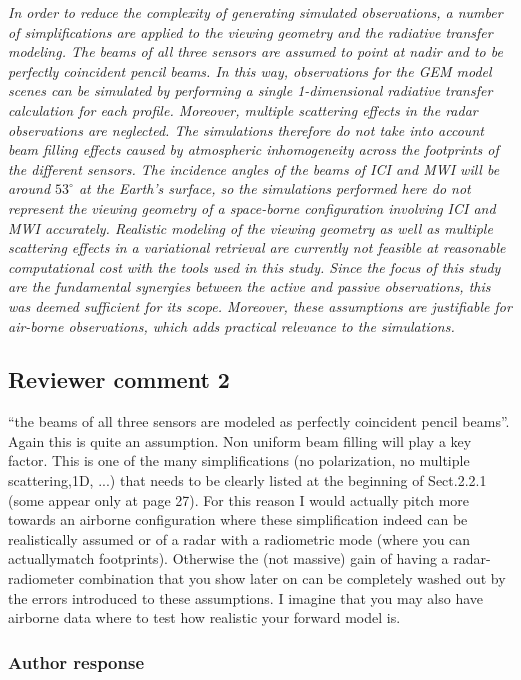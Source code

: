 \documentclass[11pt]{scrartcl}
\begin{document}
{\itshape 
In order to reduce the complexity of generating simulated observations, a number
of simplifications are applied to the viewing geometry and the radiative
transfer modeling. The beams of all three sensors are assumed to point at nadir
and to be perfectly coincident pencil beams. In this way, observations for the
GEM model scenes can be simulated by performing a single 1-dimensional radiative
transfer calculation for each profile. Moreover, multiple scattering effects in
the radar observations are neglected. The simulations therefore do not take into
account beam filling effects caused by atmospheric inhomogeneity across the
footprints of the different sensors. The incidence angles of the beams of ICI
and MWI will be around $53^\circ$ at the Earth's surface, so the simulations
performed here do not represent the viewing geometry of a space-borne
configuration involving ICI and MWI accurately. Realistic modeling of the
viewing geometry as well as multiple scattering effects in a variational
retrieval are currently not feasible at reasonable computational cost with the
tools used in this study. Since the focus of this study are the fundamental
synergies between the active and passive observations, this was deemed
sufficient for its scope. Moreover, these assumptions are justifiable for
air-borne observations, which adds practical relevance to the simulations.
}

\subsection*{Reviewer comment 2}

 “the beams of all three sensors are modeled as perfectly coincident pencil
beams”. Again this is quite an assumption. Non uniform beam filling will play a
key factor. This is one of the many simplifications (no polarization, no multiple
scattering,1D, ...) that needs to be clearly listed at the beginning of
Sect.2.2.1 (some appear only at page 27). For this reason I would actually pitch
more towards an airborne configuration where these simplification indeed can
be realistically assumed or of a radar with a radiometric mode (where you can
actuallymatch footprints). Otherwise the (not massive) gain of having a
radar-radiometer combination that you show later on can be completely washed
out by the errors introduced to these assumptions. I imagine that you may also
have airborne data where to test how realistic your forward model is.

\subsubsection*{Author response}
\end{document}
